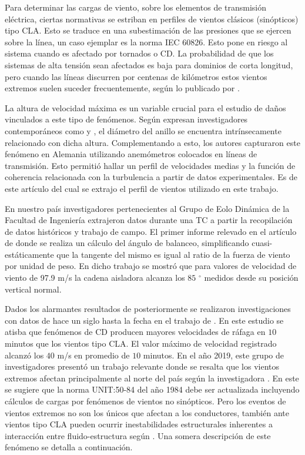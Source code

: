 Para determinar las cargas de viento, sobre los elementos de transmisión eléctrica, ciertas normativas se estriban en perfiles de vientos clásicos (sinópticos) tipo \gls{CLA}. Esto se traduce en una subestimación de las presiones que se ejercen sobre la línea, un caso ejemplar es la norma \gls{IEC} 60826. Esto pone en riesgo al sistema cuando es afectado por tornados o CD. La probabilidad de que los sistemas de alta tensión sean afectados es baja para dominios de corta longitud, pero cuando las líneas discurren por centenas de kilómetros estos vientos extremos suelen suceder frecuentemente, según lo publicado por \cite{ang1984probability}. 

La altura de velocidad máxima es un variable crucial para el estudio de daños vinculados a este tipo de fenómenos. Según expresan investigadores contemporáneos como \cite{holmes2002re} y \cite{abd2013coupled}, el diámetro del anillo se encuentra intrínsecamente relacionado con dicha altura. Complementando a esto, los autores \cite{stengel2017measurements} capturaron este fenómeno en Alemania utilizando anemómetros colocados en líneas de transmisión. Esto permitió hallar un perfil de velocidades medias y la función de coherencia relacionada con la turbulencia a partir de datos experimentales. Es de este artículo del cual se extrajo el perfil de vientos utilizado en este trabajo.

En nuestro país investigadores pertenecientes al Grupo de Eolo Dinámica de la Facultad de Ingeniería extrajeron datos durante una TC a partir la recopilación de datos históricos y trabajo de campo. El primer informe relevado en el artículo de \cite{duranona2009analysis} donde se realiza un cálculo del ángulo de balanceo, simplificando cuasi-estáticamente que la tangente del mismo es igual al ratio de la fuerza de viento por unidad de peso. En dicho trabajo se mostró que para valores de velocidad de viento de 97.9 m/s la cadena aisladora alcanza los $85$ $^\circ$ medidos desde su posición vertical normal.

Dados los alarmantes resultados de \cite{duranona2009analysis} posteriormente se realizaron investigaciones con datos de hace un siglo hasta la fecha en el trabajo de \cite{duranona2015significance}. En este estudio se atisba que fenómenos de CD producen mayores velocidades de ráfaga en $10$ minutos que los vientos tipo CLA. El valor máximo de velocidad registrado alcanzó los $40$ m/s en promedio de $10$ minutos. En el año 2019, este grupo de investigadores presentó un trabajo relevante donde se resalta que los vientos extremos afectan principalmente al norte del país según la investigadora \cite{duranona2019first}. En este se sugiere que la norma UNIT:50-84 del año 1984 debe ser actualizada incluyendo cálculos de cargas por fenómenos de vientos no sinópticos. Pero los eventos de vientos extremos no son los únicos que afectan a los conductores, también ante vientos tipo CLA pueden ocurrir inestabilidades estructurales inherentes a interacción entre fluido-estructura según \cite{luongo2007linear}. Una somera descripción de este fenómeno se detalla a continuación. 

